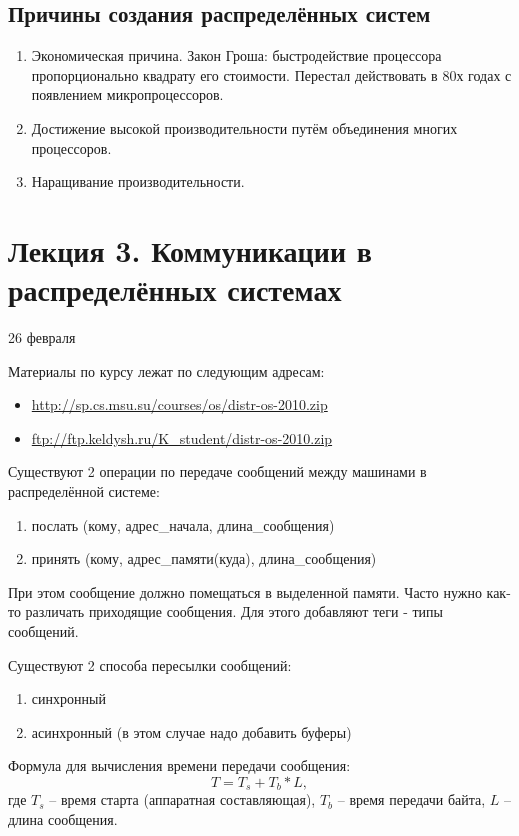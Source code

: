 \documentclass[a4paper,12pt]{article}
\begin{document}
	\subsection{\bf Причины создания распределённых систем}
	\begin{enumerate}
		\item Экономическая причина. Закон Гроша: быстродействие процессора пропорционально
		квадрату его стоимости. Перестал действовать в 80х годах с появлением микропроцессоров.
		\item Достижение высокой производительности путём объединения многих процессоров.
		\item Наращивание производительности.
	\end{enumerate}
	\section{\bf Лекция 3. Коммуникации в распределённых системах}
	\centerline{26 февраля}
	Материалы по курсу лежат по следующим адресам:
	\begin{itemize}
		\item \url{http://sp.cs.msu.su/courses/os/distr-os-2010.zip}
		\item \url{ftp://ftp.keldysh.ru/K_student/distr-os-2010.zip}
	\end{itemize}
	Существуют 2 операции по передаче сообщений между машинами в распределённой системе:
	\begin{enumerate}
		\item послать (кому, адрес\_начала, длина\_сообщения)
		\item принять (кому, адрес\_памяти(куда), длина\_сообщения)
	\end{enumerate}
	При этом сообщение должно помещаться в выделенной памяти. Часто нужно как-то различать
приходящие сообщения. Для этого добавляют теги - типы сообщений.

	Существуют 2 способа пересылки сообщений:
	\begin{enumerate}
		\item синхронный
		\item асинхронный (в этом случае надо добавить буферы)
	\end{enumerate}
	Формула для вычисления времени передачи сообщения:
$$T=T_s+T_b*L,$$
	где $T_s$ -- время старта (аппаратная составляющая), $T_b$ -- время передачи байта,
$L$ -- длина сообщения.
\end{document}
